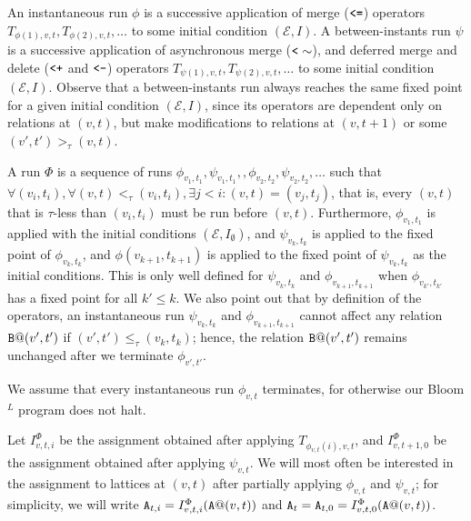 An instantaneous run $\phi$ is a successive application of merge ($\tt{<=}$) operators $T_{\phi(1),v,t}, T_{\phi(2),v,t}, \dots$ to some initial condition $(\mathcal{E}, I)$. 
A between-instants run $\psi$ is a successive application of asynchronous merge ($\tt{<}\sim$), and deferred merge and delete ($\tt{<+}$ and $\tt{<-}$) operators $T_{\psi(1),v,t}, T_{\psi(2),v,t}, \dots$ to some initial condition $(\mathcal{E}, I)$.
Observe that a between-instants run always reaches the same fixed point for a given initial condition $(\mathcal{E}, I)$, since its operators are dependent only on relations at $(v,t)$, but make modifications to relations at $(v,t+1)$ or some $(v',t') >_\tau (v,t)$. 

A run $\Phi$ is a sequence of runs $\phi_{v_1,t_1}, \psi_{v_1,t_1},, \phi_{v_2,t_2}, \psi_{v_2,t_2}, \dots$ such that $\forall (v_i, t_i), \forall (v, t) <_\tau (v_i, t_i), \exists j < i: (v, t) = (v_j, t_j)$, that is, every $(v,t)$ that is $\tau$-less than $(v_i, t_i)$ must be run before $(v,t)$.
Furthermore, $\phi_{v_1, t_1}$ is applied with the initial conditions $(\mathcal{E}, I_\emptyset)$, and $\psi_{v_k,t_k}$ is applied to the fixed point of $\phi_{v_k, t_k}$, and $\phi(v_{k+1}, t_{k+1})$ is applied to the fixed point of $\psi_{v_k, t_k}$ as the initial conditions.
This is only well defined for $\psi_{v_k, t_k}$ and $\phi_{v_{k+1}, t_{k+1}}$ when $\phi_{v_{k'}, t_{k'}}$ has a fixed point for all $k' \leq k$.
We also point out that by definition of the operators, an instantaneous run $\psi_{v_k,t_k}$ and $\phi_{v_{k+1},t_{k+1}}$ cannot affect any relation $\tt{B}@(v',t')$ if $(v',t') \leq_\tau (v_k,t_k)$;
hence, the relation $\tt{B}@(v',t')$ remains unchanged after we terminate $\phi_{v',t'}$.

We assume that every instantaneous run $\phi_{v,t}$ terminates, for otherwise our Bloom$^L$ program does not halt.

Let $I^\Phi_{v,t,i}$ be the assignment obtained after applying $T_{\phi_{v,t}(i),v,t}$, and $I^\Phi_{v,t+1,0}$ be the assignment obtained after applying $\psi_{v,t}$.
We will most often be interested in the assignment to lattices at $(v,t)$ after partially applying $\phi_{v,t}$ and $\psi_{v,t}$;
for simplicity, we will write $\tt{A}_{t,i} = I^\Phi_{v,t,i}(\tt{A}@(v,t))$ and $\tt{A}_{t} = \tt{A}_{t,0} = I^\Phi_{v,t,0}(\tt{A}@(v,t))$.
